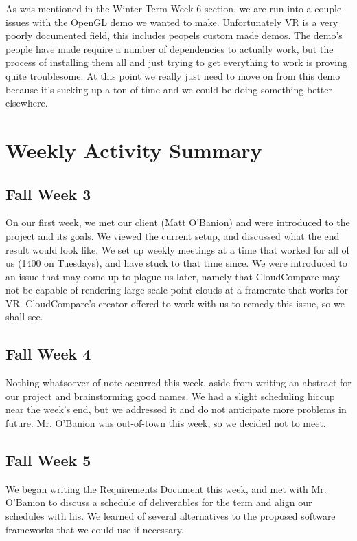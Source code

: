 \documentclass{article}
\begin{document}
As was mentioned in the Winter Term Week 6 section, we are run into a couple issues with the OpenGL demo we wanted to make.
Unfortunately VR is a very poorly documented field, this includes peopels custom made demos.
The demo's people have made require a number of dependencies to actually work, but the process of installing them all and just trying to get everything to work is proving quite troublesome.
At this point we really just need to move on from this demo because it's sucking up a ton of time and we could be doing something better elsewhere.

\section{Weekly Activity Summary}
\subsection{Fall Week 3}

On our first week, we met our client (Matt O'Banion) and were introduced to the project and its goals. 
We viewed the current setup, and discussed what the end result would look like. We set up weekly meetings at a time that worked for all of us (1400 on Tuesdays), and have stuck to that time since. 
We were introduced to an issue that may come up to plague us later, namely that CloudCompare may not be capable of rendering large-scale point clouds at a framerate that works for VR. 
CloudCompare's creator offered to work with us to remedy this issue, so we shall see.

\subsection{Fall Week 4}

Nothing whatsoever of note occurred this week, aside from writing an abstract for our project and brainstorming good names. 
We had a slight scheduling hiccup near the week's end, but we addressed it and do not anticipate more problems in future. 
Mr. O'Banion was out-of-town this week, so we decided not to meet.

\subsection{Fall Week 5}

We began writing the Requirements Document this week, and met with Mr. O'Banion to discuss a schedule of deliverables for the term and align our schedules with his. 
We learned of several alternatives to the proposed software frameworks that we could use if necessary.
\end{document}
